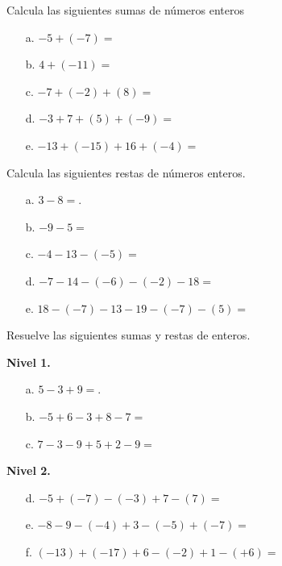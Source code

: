 \documentclass[spanish,letterpaper, 11pt, addpoints, answers]{exam}
\begin{document}
\begin{questions}

\question Calcula las siguientes sumas de números enteros
\begin{multicols}{2}
\begin{itemize}
\item[a. ]$-5+(-7) =$
\item[b. ]$4+(-11) =$
\item[c. ]$-7+(-2)+(8) =$
\item[d. ]$-3+7+(5)+(-9) =$
\item[e. ]$-13+(-15)+16+(-4)=$
\end{itemize}
\end{multicols}

\question Calcula las siguientes restas de números enteros.
\begin{multicols}{2}
\begin{itemize}
\item[a.] $3-8=$.

\item[b.] $-9-5=$

\item[c.] $-4-13-(-5)=$

\item[d.] $-7-14-(-6)-(-2)-18=$

\item[e.] $18-(-7)-13-19-(-7)-(5)=$


\end{itemize}
\end{multicols}

\question Resuelve las siguientes sumas y restas de enteros.
\begin{multicols}{2}
\textbf{Nivel 1.}\\
\begin{itemize}
\item[a.] $5-3+9=$.

\item[b.] $-5+6-3+8-7=$

\item[c.] $7-3-9+5+2-9=$
\end{itemize}

\textbf{Nivel 2.}\\
\begin{itemize}
\item[d.] $-5+(-7)-(-3)+7-(7)=$

\item[e.] $-8-9-(-4)+3-(-5)+(-7)=$

\item[f.] $(-13)+(-17)+6-(-2)+1-(+6)=$
\end{itemize}
\end{multicols}


\end{questions}
\end{document}
